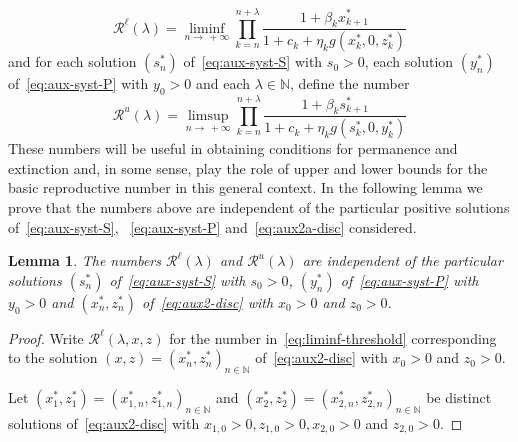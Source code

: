 \documentclass[reqno]{amsart}
\newtheorem{lemma}{Lemma}
\newcommand{\cR}{\mathcal R}
\newcommand{\N}{\ensuremath{\mathds N}}
\begin{document}
{{\begin{equation}\label{eq:liminf-threshold}
\cR^\ell(\lambda) = \liminf_{n \to \, +\infty} \prod_{k=n}^{n+\lambda} \dfrac{1+\beta_kx^*_{k+1}}{1+c_k+\eta_k g(x^*_k,0,z^*_k)}
\end{equation}
and for each solution $(s_n^*)$ of~\eqref{eq:aux-syst-S} with $s_0>0$, each solution $(y_n^*)$ of~\eqref{eq:aux-syst-P} with $y_0>0$ and each $\lambda \in \N$, define the number
\begin{equation}\label{eq:limsup-threshold}
\cR^u(\lambda) = \limsup_{n \to \, +\infty} \prod_{k=n}^{n+\lambda} \dfrac{1+\beta_ks^*_{k+1}}{1+c_k+\eta_k  g(s^*_k,0,y^*_k)}
\end{equation}
These numbers will be useful in obtaining conditions for permanence and extinction and, in some sense, play the role of upper and lower bounds for the basic reproductive number in this general context. In the following lemma we prove that the numbers above are independent of the particular positive solutions of~\eqref{eq:aux-syst-S}, ~\eqref{eq:aux-syst-P} and~\eqref{eq:aux2a-disc} considered.

\begin{lemma} \label{lema:indep}
The numbers $\cR^\ell(\lambda)$ and $\cR^u(\lambda)$ are independent of the particular solutions $(s_n^*)$ of~\eqref{eq:aux-syst-S} with $s_0>0$,  $(y_n^*)$ of~\eqref{eq:aux-syst-P} with $y_0>0$ and $(x_n^*,z_n^*)$ of~\eqref{eq:aux2-disc} with $x_0>0$ and $z_0>0$.
\end{lemma}

\begin{proof} Write $\cR^\ell(\lambda,x,z)$ for the number in~\eqref{eq:liminf-threshold} corresponding to the solution $(x,z)=(x_n^*,z_n^*)_{n \in \N}$ of~\eqref{eq:aux2-disc} with $x_0>0$ and $z_0>0$.

Let $(x_1^*,z_1^*)=(x^*_{1,n},z^*_{1,n})_{n \in \N}$ and $(x_2^*,z_2^*)=(x^*_{2,n},z^*_{2,n})_{n \in \N}$ be distinct solutions of~\eqref{eq:aux2-disc} with $x_{1,0}>0,z_{1,0}>0,x_{2,0}>0$ and $z_{2,0}>0$.


\end{proof}}}
\end{document}
